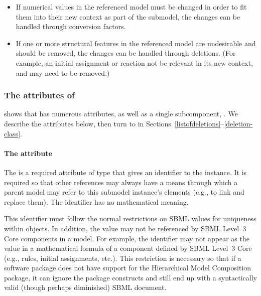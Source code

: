 \begin{itemize}

\item If numerical values in the referenced model must be changed in
  order to fit them into their new context as part of the submodel, the
  changes can be handled through conversion factors.

\item If one or more structural features in the referenced model are
  undesirable and should be removed, the changes can be handled through
  deletions.  (For example, an initial assignment or reaction not be
  relevant in its new context, and may need to be removed.)

\end{itemize}


\subsubsection{The attributes of }

 shows that \Submodel has numerous attributes, as well
as a single subcomponent, .  We describe the
attributes below, then turn to  in
Sections~\ref{listofdeletions}--\ref{deletion-class}.


\paragraph{The \fixttspace{} attribute}

The  is a required attribute of type  that gives
an identifier to the \Submodel instance.  It is required so that other
references may always have a means through which a parent model may
refer to this submodel instance's elements (e.g., to link and replace
them).  The identifier has no mathematical meaning.

This identifier must follow the normal restrictions on SBML
 values for uniqueness within \Model objects.  In
addition, the  value may not be referenced by SBML Level~3
Core components in a model.  For example, the identifier may not appear
as the  value in a mathematical formula of a component
defined by SBML Level~3 Core (e.g., rules, initial assignments, etc.).
This restriction is necessary so that if a software package does not
have support for the Hierarchical Model Composition package, it can
ignore the package constructs and still end up with a syntactically
valid (though perhaps diminished) SBML document.


